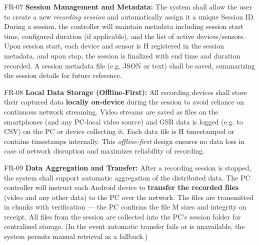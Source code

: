 \documentclass[11pt,a4paper]{report}
\begin{document}
  FR-07                   \textbf{Session Management and Metadata:} The system shall allow the user to create a new \textit{recording session} and automatically assign it a unique Session ID. During a session, the controller will maintain metadata including session start time, configured duration (if applicable), and the list of active devices/sensors. Upon session start, each device and sensor is         H
                          registered in the session metadata, and upon stop, the session is finalized with end time and duration                                                                                                                                                                                                                                                                             
                          recorded\cite{SamsungHealth2020}\cite{Fowles1981}. A session metadata file (e.g. JSON or      
                          text) shall be saved, summarizing the session details for future reference.                                                                                                                                                                                                                                                                                                        

  FR-08                   \textbf{Local Data Storage (Offline-First):} All recording devices shall store their captured data \textbf{locally on-device} during the session to avoid reliance on continuous network streaming. Video streams are saved as files on the smartphones (and any PC-local video source) and GSR data is logged (e.g. to CSV) on the PC or device collecting it. Each data file is            H
                          timestamped or contains timestamps internally. This \textit{offline-first} design ensures no data loss in case of network disruption and maximizes reliability of recording.                                                                                                                                                                                                              

  FR-09                   \textbf{Data Aggregation and Transfer:} After a recording session is stopped, the system shall support automatic aggregation of the distributed data. The PC controller will instruct each Android device to \textbf{transfer the recorded files} (video and any other data) to the PC over the network. The files are transmitted in chunks with verification --- the PC confirms the file   M
                          sizes and integrity on receipt\cite{Healey2005}. All files from the session are collected into the PC's session folder for centralized storage. (In the event automatic transfer fails or is unavailable, the system permits manual retrieval as a        
                          fallback.)                                                                                                                                                                                                                                                                                                                                                                         
\end{document}
